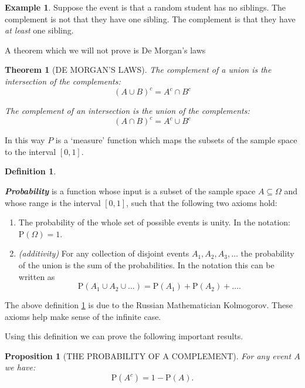 \documentclass[
]{book}
\newtheorem{theorem}{Theorem}[chapter]
\newtheorem{proposition}{Proposition}[chapter]
\theoremstyle{definition}
\newtheorem{definition}{Definition}[chapter]
\theoremstyle{definition}
\newtheorem{example}{Example}[chapter]
\theoremstyle{definition}
\theoremstyle{definition}
\theoremstyle{remark}
\begin{document}
\begin{example}
Suppose the event is that a random student has no siblings. The complement is not that they have one sibling. The complement is that they have \emph{at least} one sibling.
\end{example}

A theorem which we will not prove is De Morgan's laws

\begin{theorem}[DE MORGAN'S LAWS]
\protect\hypertarget{thm:demorgan}{}\label{thm:demorgan}The complement of a union is the intersection of the complements:
\[(A \cup B)^{c} = A^{c} \cap B^{c}\]

The complement of an intersection is the union of the complements:
\[(A \cap B)^{c} = A^{c} \cup B^{c}\]
\end{theorem}

In this way \(P\) is a `measure' function which maps the subsets of the sample space to the interval \(\left[0,1\right]\).

\begin{definition}
\protect\hypertarget{def:probability}{}\label{def:probability}

\textbf{\emph{Probability}} is a function whose input is a subset of the sample space \(A \subseteq \Omega\) and whose range is the interval \(\left[0,1\right]\), such that the following two axioms hold:

\begin{enumerate}
\def\labelenumi{(\roman{enumi})}
\item
  The probability of the whole set of possible events is unity. In the notation: \(\text{P}(\Omega ) =1\).
\item
  \emph{(additivity)} For any collection of disjoint events \(A_1 , A_2, A_3, \dots\) the probability of the union is the sum of the probabilities. In the notation this can be written as \[\text{P}(A_1 \cup A_2 \cup \dots ) = \text{P}(A_1) + \text{P}(A_2)+\dots .\]
\end{enumerate}

\end{definition}

The above definition \ref{def:probability} is due to the Russian Mathematician Kolmogorov. These axioms help make sense of the infinite case.

Using this definition we can prove the following important results.

\begin{proposition}[THE PROBABILITY OF A COMPLEMENT]
\protect\hypertarget{prp:sum}{}\label{prp:sum}For any event \(A\) we have:
\[\text{P}(A^{c}) = 1 - \text{P}(A).\]
\end{proposition}
\end{document}
